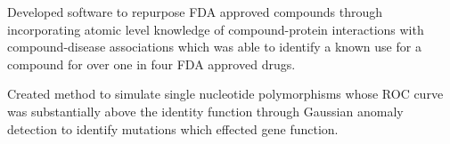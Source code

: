 \documentclass[letterpaper]{deedy-resume} %
\begin{document}
\begin{minipage}[t]{0.66\textwidth}
\begin{tightitemize}
\end{tightitemize}





\sectionspace %



\begin{tightitemize}
\item Developed software to repurpose FDA approved compounds through incorporating atomic level knowledge of compound-protein interactions with compound-disease associations  which was able to identify a known use for a compound for over one in four FDA approved drugs.
\end{tightitemize}

\sectionspace %



\begin{tightitemize}
\item Created method to simulate single nucleotide polymorphisms whose ROC curve was substantially above the identity function through Gaussian anomaly detection to identify mutations which effected gene function.
\end{tightitemize}

\sectionspace %




\end{minipage}
\end{document}
